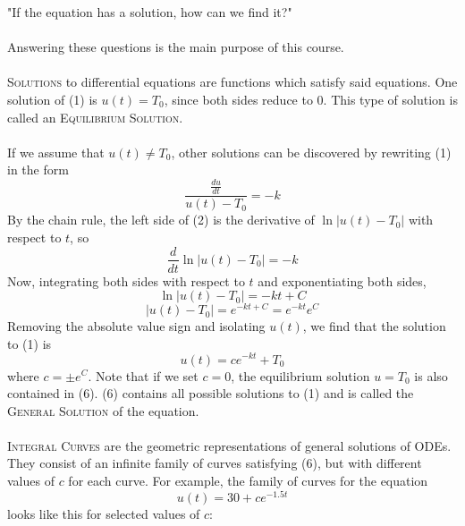 \documentclass[11pt]{article}
\theoremstyle{definition}
\begin{document}
"If the equation has a solution, how can we find it?"\\\\
Answering these questions is the main purpose of this course.\\\\
\textsc{Solutions} to differential equations are functions which satisfy said equations. One solution of (1) is $u(t) = T_0$, since both sides reduce to 0. This type of solution is called an \textsc{Equilibrium Solution}.
\\\\If we assume that $u(t) \neq T_0$, other solutions can be discovered by rewriting (1) in the form
\begin{equation}
\frac{\frac{du}{dt}}{u(t) - T_0} = -k
\end{equation}
By the chain rule, the left side of (2) is the derivative of $\ln{|u(t) - T_0|}$ with respect to $t$, so
\begin{equation}
\frac{d}{dt}\ln{|u(t) - T_0|} = -k
\end{equation}
Now, integrating both sides with respect to $t$ and exponentiating both sides,
\begin{equation}
\ln{|u(t) - T_0|} = -kt + C
\end{equation}
\begin{equation}
|u(t) - T_0| = e^{-kt + C} = e^{-kt}e^C
\end{equation}
Removing the absolute value sign and isolating $u(t)$, we find that the solution to (1) is
\begin{equation}
u(t) = ce^{-kt} + T_0
\end{equation}
where $c = \pm e^C$. Note that if we set $c = 0$, the equilibrium solution $u = T_0$ is also contained in (6). (6) contains all possible solutions to (1) and is called the \textsc{General Solution} of the equation.\\\\
\textsc{Integral Curves} are the geometric representations of general solutions of ODEs. They consist of an infinite family of curves satisfying (6), but with different values of $c$ for each curve. For example, the family of curves for the equation \begin{equation}u(t) = 30 + ce^{-1.5t}\end{equation} looks like this for selected values of $c$:
\end{document}
